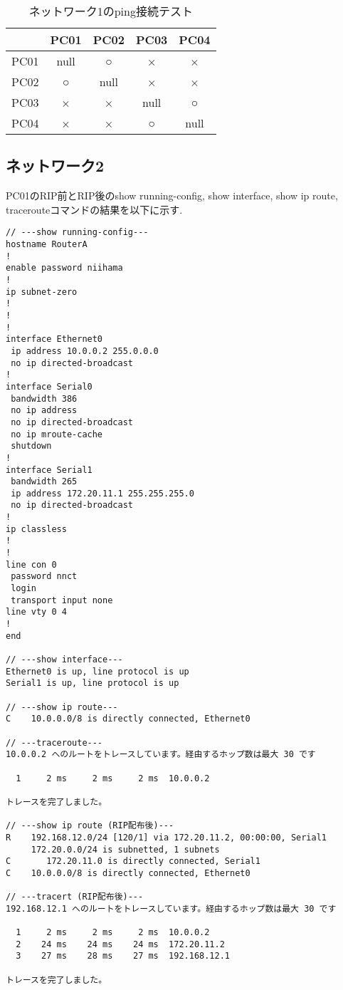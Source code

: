 \documentclass{jsarticle}
\begin{document}
\begin{table}[htb]
  \begin{center}
    \caption{ネットワーク1のping接続テスト}
    \begin{tabular}{|c|c|c|c|c|} \hline
       & PC01 & PC02 & PC03 & PC04   \\ \hline 
      PC01 & null & ○ & × & ×  \\ \hline
      PC02 & ○ & null & × & ×   \\ \hline
      PC03 & × & × & null & ○   \\ \hline
       PC04 & × & × & ○ & null    \\ \hline
    \end{tabular}
	\label{tab:network1_ping}
  \end{center}
\end{table}

\subsection{ネットワーク2}

PC01のRIP前とRIP後のshow running-config, show interface, show ip route, tracerouteコマンドの結果を以下に示す.

\begin{lstlisting}[basicstyle=\ttfamily\small, frame=single]
// ---show running-config---
hostname RouterA
!
enable password niihama
!
ip subnet-zero
!
!
!
interface Ethernet0
 ip address 10.0.0.2 255.0.0.0
 no ip directed-broadcast
!
interface Serial0
 bandwidth 386
 no ip address
 no ip directed-broadcast
 no ip mroute-cache
 shutdown
!
interface Serial1
 bandwidth 265
 ip address 172.20.11.1 255.255.255.0
 no ip directed-broadcast
!
ip classless
!
!
line con 0
 password nnct
 login
 transport input none
line vty 0 4
!
end

// ---show interface---
Ethernet0 is up, line protocol is up
Serial1 is up, line protocol is up

// ---show ip route---
C    10.0.0.0/8 is directly connected, Ethernet0

// ---traceroute---
10.0.0.2 へのルートをトレースしています。経由するホップ数は最大 30 です

  1     2 ms     2 ms     2 ms  10.0.0.2

トレースを完了しました。

// ---show ip route (RIP配布後)---
R    192.168.12.0/24 [120/1] via 172.20.11.2, 00:00:00, Serial1
     172.20.0.0/24 is subnetted, 1 subnets
C       172.20.11.0 is directly connected, Serial1
C    10.0.0.0/8 is directly connected, Ethernet0

// ---tracert (RIP配布後)--- 
192.168.12.1 へのルートをトレースしています。経由するホップ数は最大 30 です

  1     2 ms     2 ms     2 ms  10.0.0.2
  2    24 ms    24 ms    24 ms  172.20.11.2
  3    27 ms    28 ms    27 ms  192.168.12.1

トレースを完了しました。
\end{lstlisting}
\end{document}
